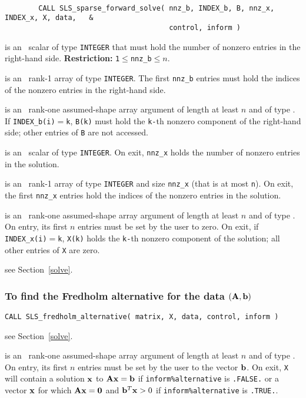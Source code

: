 \documentclass{galahad}
\newcommand{\packagename}{SLS}
\begin{document}
{\tt
\begin{verbatim}
        CALL SLS_sparse_forward_solve( nnz_b, INDEX_b, B, nnz_x, INDEX_x, X, data,   &
                                       control, inform )
\end{verbatim}
}
\vspace*{-4mm}
\begin{description}
 is an \intentin\ scalar of type  {\tt INTEGER} that
must hold the number of nonzero entries in the right-hand side.
{\bf Restriction:} {\tt 1$\le$nnz\_b$\le n$}.

  is an  \intentin\ rank-1 array of type {\tt INTEGER}.
The first {\tt nnz\_b} entries must hold the indices of the nonzero entries
in the right-hand side.

 is an  \intentin\ rank-one assumed-shape array argument of
length at least $n$ and of type \realdp.
If {\tt INDEX\_b(i)}$=${\tt k}, {\tt B(k)} must hold the {\tt k-}th
nonzero component of the right-hand side; other entries of {\tt B}
are not accessed.

  is an  \intentout\ scalar  of type  {\tt INTEGER}.
On exit, {\tt nnz\_x} holds the number of nonzero entries in the solution.

  is an  \intentout\ rank-1  array of type {\tt INTEGER} and
size {\tt nnz\_x} (that is at most {\tt n}). On exit, the first
{\tt nnz\_x} entries hold the indices of the nonzero entries in the solution.

 is an  \intentinout\ rank-one assumed-shape array argument of
length at least $n$ and of type \realdp.
On entry, its first $n$ entries must be set by the user to zero.
On exit, if {\tt INDEX\_x(i)}$=${\tt k}, {\tt X(k)} holds the {\tt k-}th
nonzero component of the solution; all other entries of {\tt X} are zero.

 see Section~\ref{solve}.

\end{description}

\subsubsection{To find the Fredholm alternative for the data $({\mathbf{A}},{\mathbf{b}})$}
\label{fredholm}

\hskip0.5in
{\tt CALL \packagename\_fredholm\_alternative( matrix, X, data, control,
 inform )}

\begin{description}

see Section~\ref{solve}.

 is an \intentinout\ rank-one assumed-shape array argument of
length at least $n$ and of type \realdp.
On entry, its first $n$ entries must be set by the user to the vector ${\mathbf{b}}$.
On exit, {\tt X} will contain a solution ${\mathbf{x}}$ to ${\mathbf{A}} {\mathbf{x}} = {\mathbf{b}}$ if
{\tt inform\%alternative} is {\tt .FALSE.} or a vector ${\mathbf{x}}$ for which
${\mathbf{A}} {\mathbf{x}} = {\mathbf{0}}$ and ${\mathbf{b}}^T {\mathbf{x}} > 0$ if
{\tt inform\%alternative} is {\tt .TRUE.}.
\end{description}
\end{document}
